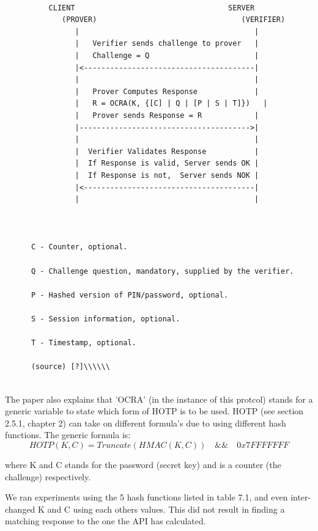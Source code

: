 \documentclass[bsc,frontabs,twoside,singlespacing,parskip,deptreport]{infthesis}     %
\begin{document}
\pagebreak
\begin{Verbatim}[commandchars=\\\{\}, fontsize=\small]

	      CLIENT                                   SERVER
             (PROVER)                                 (VERIFIER)
                |                                        |
                |   Verifier sends challenge to prover   |
                |   Challenge = Q                        |
                |<---------------------------------------|
                |                                        |
                |   Prover Computes Response             |
                |   R = OCRA(K, {[C] | Q | [P | S | T]})   |
                |   Prover sends Response = R            |
                |--------------------------------------->|
                |                                        |
                |  Verifier Validates Response           |
                |  If Response is valid, Server sends OK |
                |  If Response is not,  Server sends NOK |
                |<---------------------------------------|
                |                                        |



      C - Counter, optional.

      Q - Challenge question, mandatory, supplied by the verifier.

      P - Hashed version of PIN/password, optional.

      S - Session information, optional.

      T - Timestamp, optional.
      
      (source) [?]\\\\\\
            
\end{Verbatim}


The paper also explains that 'OCRA' (in the instance of this protcol) stands for a generic variable to state which form of HOTP is to be used. HOTP (see section 2.5.1, chapter 2) can take on different formula's due to using different hash functions. The generic formula is:\\
$$HOTP(K,C) = Truncate(HMAC(K,C)) \quad \&\& \quad 0x7FFFFFFF$$

where K and C stands for the password (secret key) and is a counter (the challenge) respectively.

We ran experiments using the 5 hash functions listed in table 7.1, and even inter-changed K and C using each others values. This did not result in finding a matching response to the one the API has calculated.\\
\end{document}
